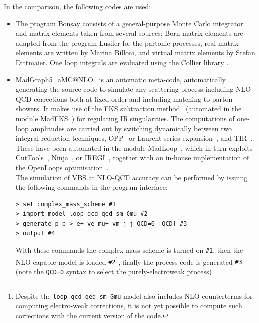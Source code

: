 In the comparison, the following codes are used: 

\begin{itemize}
 \item The program {\sc Bonsay} consists of a general-purpose Monte Carlo integrator
and matrix elements taken from several sources: Born matrix elements are
adapted from the program {\sc Lusifer} \cite{Dittmaier:2002ap} for the partonic
processes, real matrix elements are written by Marina Billoni, and virtual
matrix elements by Stefan Dittmaier.
One loop integrals are evaluated using the {\sc Collier} library
\cite{Denner:2014gla,Denner:2016kdg}.

  \item {\sc MadGraph5\_aMC@NLO}~\cite{Alwall:2014hca} is an automatic meta-code, automatically generating the source code to simulate any scattering process
      including NLO QCD corrections both at fixed order and including matching to parton showers. It makes use of the FKS subtraction method~\cite{Frixione:1995ms,
        Frixione:1997np} (automated in the module {\sc MadFKS}~\cite{Frederix:2009yq,
        Frederix:2016rdc}) for regulating IR singularities. The computations of one-loop amplitudes are carried out by switching dynamically between 
        two integral-reduction techniques, OPP~\cite{Ossola:2006us} or Laurent-series expansion~\cite{Mastrolia:2012bu},
        and TIR~\cite{Passarino:1978jh,Davydychev:1991va,Denner:2005nn}. These have been automated in the module {\sc MadLoop}~\cite{Hirschi:2011pa}, which 
        in turn exploits {\sc CutTools}~\cite{Ossola:2007ax}, {\sc Ninja}~\cite{Peraro:2014cba,
        Hirschi:2016mdz}, or {\sc IREGI}~\cite{ShaoIREGI}, together with an in-house implementation of the {\sc OpenLoops} optimisation~\cite{Cascioli:2011va}.\\
        The simulation of VBS at NLO-QCD accuracy can be performed by issuing the following commands in the program interface:
\begin{verbatim}
> set complex_mass_scheme #1
> import model loop_qcd_qed_sm_Gmu #2
> generate p p > e+ ve mu+ vm j j QCD=0 [QCD] #3
> output #4
\end{verbatim}
  With these commands the complex-mass scheme is turned on {\tt \#1}, then the NLO-capable model is loaded {\tt \#2}\footnote{Despite
            the {\tt loop\_qcd\_qed\_sm\_Gmu} model also includes NLO counterterms for computing electro-weak corrections, it is not yet possible to compute such corrections 
        with the current version of the code.}, finally the process code is generated {\tt \#3} (note the {\tt QCD=0} syntax to select the purely-electroweak process)

\end{itemize}

